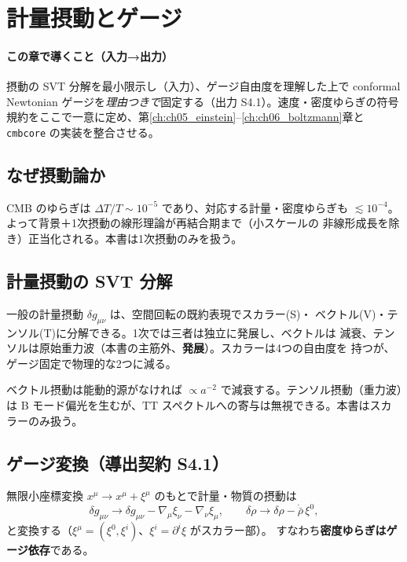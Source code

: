 \section{計量摂動とゲージ}
\label{ch:ch04_gauge}

\paragraph{この章で導くこと（入力→出力）}
摂動の SVT 分解を最小限示し（入力）、ゲージ自由度を理解した上で conformal
Newtonian ゲージを\emph{理由つきで}固定する（出力 S4.1）。速度・密度ゆらぎの符号
規約をここで一意に定め、第\ref{ch:ch05_einstein}--\ref{ch:ch06_boltzmann}章と
\texttt{cmbcore} の実装を整合させる。

\subsection{なぜ摂動論か}
CMB のゆらぎは $\Delta T/T\sim10^{-5}$ であり、対応する計量・密度ゆらぎも
$\lesssim10^{-4}$。よって背景＋1次摂動の線形理論が再結合期まで（小スケールの
非線形成長を除き）正当化される。本書は1次摂動のみを扱う。

\subsection{計量摂動の SVT 分解}
一般の計量摂動 $\delta g_{\mu\nu}$ は、空間回転の既約表現でスカラー(S)・
ベクトル(V)・テンソル(T)に分解できる。1次では三者は独立に発展し、ベクトルは
減衰、テンソルは原始重力波（本書の主筋外、\textbf{発展}）。スカラーは4つの自由度を
持つが、ゲージ固定で物理的な2つに減る。

\begin{advanced}
ベクトル摂動は能動的源がなければ $\propto a^{-2}$ で減衰する。テンソル摂動（重力波）は
B モード偏光を生むが、TT スペクトルへの寄与は無視できる。本書はスカラーのみ扱う。
\end{advanced}

\subsection{ゲージ変換（導出契約 S4.1）}
無限小座標変換 $x^\mu\to x^\mu+\xi^\mu$ のもとで計量・物質の摂動は
\begin{equation}
  \delta g_{\mu\nu}\to\delta g_{\mu\nu}-\nabla_\mu\xi_\nu-\nabla_\nu\xi_\mu,\qquad
  \delta\rho\to\delta\rho-\dot{\bar\rho}\,\xi^0,
\end{equation}
と変換する（$\xi^\mu=(\xi^0,\xi^i)$、$\xi^i=\partial^i\xi$ がスカラー部）。
すなわち\textbf{密度ゆらぎはゲージ依存}である。


